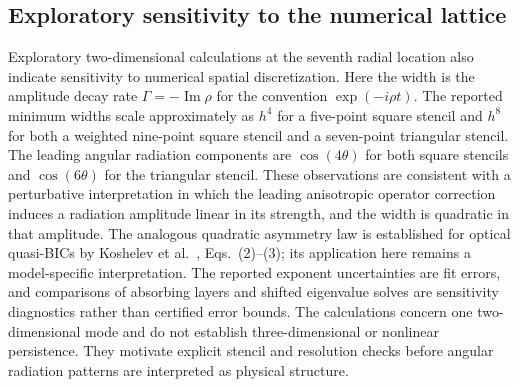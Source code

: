 \subsection{Exploratory sensitivity to the numerical lattice}

Exploratory two-dimensional calculations at the seventh radial location
also indicate sensitivity to numerical spatial discretization. Here the
width is the amplitude decay rate $\Gamma=-\operatorname{Im}\rho$ for
the convention $\exp(-i\rho t)$. The reported minimum widths scale
approximately as $h^4$ for a five-point square stencil and $h^8$ for both
a weighted nine-point square stencil and a seven-point triangular stencil.
The leading angular radiation components are $\cos(4\theta)$ for both
square stencils and $\cos(6\theta)$ for the triangular stencil. These
observations are consistent with a perturbative interpretation in which
the leading anisotropic operator correction induces a radiation amplitude
linear in its strength, and the width is quadratic in that amplitude.
The analogous quadratic asymmetry law is established for optical
quasi-BICs by Koshelev et al.~\cite{Koshelev2018}, Eqs.~(2)--(3);
its application here remains a model-specific interpretation.
The reported exponent uncertainties are fit errors, and comparisons of
absorbing layers and shifted eigenvalue solves are sensitivity diagnostics
rather than certified error bounds. The calculations concern one
two-dimensional mode and do not establish three-dimensional or nonlinear
persistence. They motivate explicit stencil and resolution checks before
angular radiation patterns are interpreted as physical structure.
